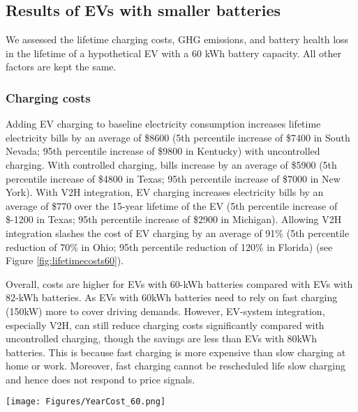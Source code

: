 \documentclass[11pt,preprint]{elsarticle}
\begin{document}
\subsection{Results of EVs with smaller batteries}

We assessed the lifetime charging costs, GHG emissions, and battery health loss in the lifetime of a hypothetical EV with a 60 kWh battery capacity. All other factors are kept the same. 

\subsubsection{Charging costs}

Adding EV charging to baseline electricity consumption increases lifetime electricity bills by an average of \$8600 (5th percentile increase of \$7400 in South Nevada; 95th percentile increase of \$9800 in Kentucky) with uncontrolled charging. With controlled charging, bills increase by an average of \$5900 (5th percentile increase of \$4800 in Texas; 95th percentile increase of \$7000 in New York). With V2H integration, EV charging increases electricity bills by an average of \$770 over the 15-year lifetime of the EV (5th percentile increase of \$-1200 in Texas; 95th percentile increase of \$2900 in Michigan). Allowing V2H integration slashes the cost of EV charging by an average of 91\% (5th percentile reduction of 70\% in Ohio; 95th percentile reduction of 120\% in Florida) (see Figure \ref{fig:lifetimecosts60}). 

Overall, costs are higher for EVs with 60-kWh batteries compared with EVs with 82-kWh batteries. As EVs with 60kWh batteries need to rely on fast charging (150kW) more to cover driving demands. However, EV-system integration, especially V2H, can still reduce charging costs significantly compared with uncontrolled charging, though the savings are less than EVs with 80kWh batteries. This is because fast charging is more expensive than slow charging at home or work. Moreover, fast charging cannot be rescheduled life slow charging and hence does not respond to price signals.

\begin{figure*}[!ht]
    \centering
    \texttt{[image: Figures/YearCost\_60.png]}
    \caption{Median lifetime charging costs of EV owners with uncontrolled charging, controlled charging, V2H in homes with electrified space heating, and V2H in homes without electrified heating. Charging costs are defined as the cost changes with the addition of an EV to the household's total electricity bills. The EV battery capacity is 60 kWh}
    \label{fig:lifetimecosts60}
\end{figure*}
\end{document}
